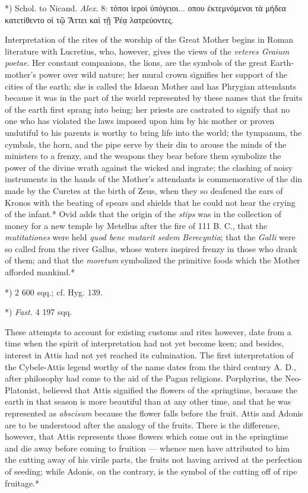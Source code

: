 \documentclass[a4paper, 11pt, oneside, polutonikogreek, english]{article}
\begin{document}
*) Schol. to Nicand. \emph{Alex.} 8: τόποι ἱεροὶ ὑπόγειοι... οπου ἐκτεμνόμενοι τὰ μήδεα κατετίθεντο οἱ τῷ Ἄττει καὶ τῇ Ῥέᾳ λατρεύοντες.

Interpretation of the rites of the worship of the Great Mother begins in Roman literature with Lucretius, who, however, gives the views of the \emph{veteres Graium poetae}. Her constant companions, the lions, are the symbols of the great Earth-mother's power over wild nature; her mural crown signifies her support of the cities of the earth; she is called the Idaean Mother and has Phrygian attendants because it was in the part of the world represented by these names that the fruits of the earth first sprang into being; her priests are castrated to signify that no one who has violated the laws imposed upon him by his mother or proven undutiful to his parents is worthy to bring life into the world; the tympanum, the cymbals, the horn, and the pipe serve by their din to arouse the minds of the ministers to a frenzy, and the weapons they bear before them symbolize the power of the divine wrath against the wicked and ingrate; the clashing of noisy instruments in the hands of the Mother's attendants is commemorative of the din made by the Curetes at the birth of Zeus, when they so deafened the ears of Kronos with the beating of spears and shields that he could not hear the crying of the infant.* Ovid adds that the origin of the \emph{stips} was in the collection of money for a new temple by Metellus after the fire of 111 B. C., that the \emph{mutitationes} were held \emph{quod bene mutarit sedem Berecyntia}; that the \emph{Galli} were so called from the river Gallus, whose waters inspired frenzy in those who drank of them; and that the \emph{moretum} symbolized the primitive foods which the Mother afforded mankind.*

*) 2 600 sqq.; cf. Hyg. 139.

*) \emph{Fast.} 4 197 sqq.

These attempts to account for existing customs and rites however, date from a time when the spirit of interpretation had not yet become keen; and besides, interest in Attis had not yet reached its culmination. The first interpretation of the Cybele-Attis legend worthy of the name dates from the third century A. D., after philosophy had come to the aid of the Pagan religions. Porphyrius, the Neo-Platonist, believed that Attis signified the flowers of the springtime, because the earth in that season is more beautiful than at any other time, and that he was represented as \emph{abscisum} because the flower falls before the fruit. Attis and Adonis are to be understood after the analogy of the fruits. There is the difference, however, that Attis represents those flowers which come out in the springtime and die away before coming to fruition --- whence men have attributed to him the cutting away of his virile parts, the fruits not having arrived at the perfection of seeding; while Adonis, on the contrary, is the symbol of the cutting off of ripe fruitage.*
\end{document}
